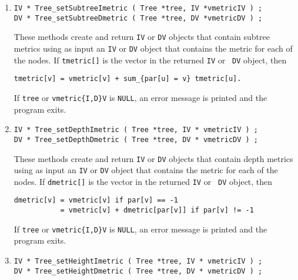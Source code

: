 \begin{enumerate}
\item
\begin{verbatim}
IV * Tree_setSubtreeImetric ( Tree *tree, IV *vmetricIV ) ;
DV * Tree_setSubtreeDmetric ( Tree *tree, DV *vmetricDV ) ;
\end{verbatim}
These methods create and return {\tt IV} or {\tt DV} objects 
that contain subtree metrics using as input an {\tt IV} or {\tt DV}
object that contains the metric for each of the nodes.
If {\tt tmetric[]} is the vector in the returned {\tt IV} or {\tt
DV} object, then
\begin{verbatim}
tmetric[v] = vmetric[v] + sum_{par[u] = v} tmetric[u].
\end{verbatim}
\par {}
If {\tt tree} or {\tt vmetric\{I,D\}V} is {\tt NULL},
an error message is printed and the program exits.
\item
\begin{verbatim}
IV * Tree_setDepthImetric ( Tree *tree, IV * vmetricIV ) ;
DV * Tree_setDepthDmetric ( Tree *tree, DV * vmetricDV ) ;
\end{verbatim}
These methods create and return {\tt IV} or {\tt DV} objects 
that contain depth metrics using as input an {\tt IV} or {\tt DV}
object that contains the metric for each of the nodes.
If {\tt dmetric[]} is the vector in the returned {\tt IV} or {\tt
DV} object, then
\begin{verbatim}
dmetric[v] = vmetric[v] if par[v] == -1
           = vmetric[v] + dmetric[par[v]] if par[v] != -1
\end{verbatim}
\par {}
If {\tt tree} or {\tt vmetric\{I,D\}V} is {\tt NULL},
an error message is printed and the program exits.
\item
\begin{verbatim}
IV * Tree_setHeightImetric ( Tree *tree, IV * vmetricIV ) ;
DV * Tree_setHeightDmetric ( Tree *tree, DV * vmetricDV ) ;
\end{verbatim}

\end{enumerate}
